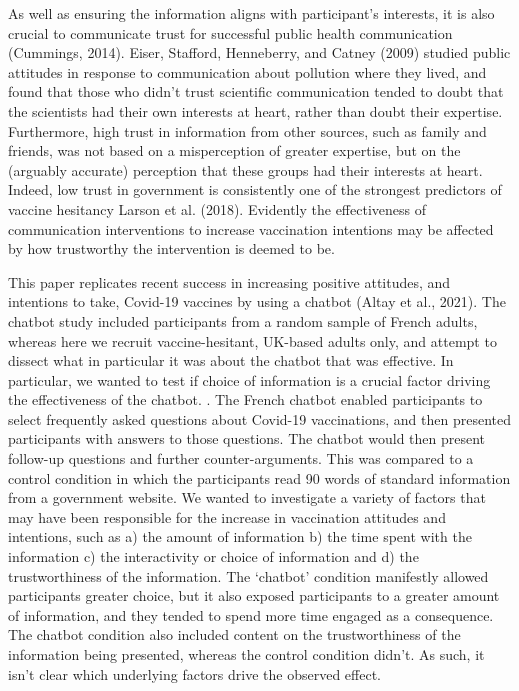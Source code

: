 \documentclass[
  english,
  ,jou,floatsintext]{apa6}
\begin{document}
As well as ensuring the information aligns with participant's interests, it is also crucial to communicate trust for successful public health communication (Cummings, 2014). Eiser, Stafford, Henneberry, and Catney (2009) studied public attitudes in response to communication about pollution where they lived, and found that those who didn't trust scientific communication tended to doubt that the scientists had their own interests at heart, rather than doubt their expertise. Furthermore, high trust in information from other sources, such as family and friends, was not based on a misperception of greater expertise, but on the (arguably accurate) perception that these groups had their interests at heart. Indeed, low trust in government is consistently one of the strongest predictors of vaccine hesitancy Larson et al. (2018). Evidently the effectiveness of communication interventions to increase vaccination intentions may be affected by how trustworthy the intervention is deemed to be.

This paper replicates recent success in increasing positive attitudes, and intentions to take, Covid-19 vaccines by using a chatbot (Altay et al., 2021). The chatbot study included participants from a random sample of French adults, whereas here we recruit vaccine-hesitant, UK-based adults only, and attempt to dissect what in particular it was about the chatbot that was effective. In particular, we wanted to test if choice of information is a crucial factor driving the effectiveness of the chatbot. . The French chatbot enabled participants to select frequently asked questions about Covid-19 vaccinations, and then presented participants with answers to those questions. The chatbot would then present follow-up questions and further counter-arguments. This was compared to a control condition in which the participants read 90 words of standard information from a government website. We wanted to investigate a variety of factors that may have been responsible for the increase in vaccination attitudes and intentions, such as a) the amount of information b) the time spent with the information c) the interactivity or choice of information and d) the trustworthiness of the information. The `chatbot' condition manifestly allowed participants greater choice, but it also exposed participants to a greater amount of information, and they tended to spend more time engaged as a consequence. The chatbot condition also included content on the trustworthiness of the information being presented, whereas the control condition didn't. As such, it isn't clear which underlying factors drive the observed effect.
\end{document}
